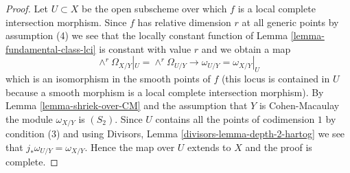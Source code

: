 \documentclass[10pt,a4paper]{amsart}
\theoremstyle{plain}
\theoremstyle{definition}
\theoremstyle{remark}
\numberwithin{equation}{subsection}
\begin{document}
\begin{proof}
Let $U \subset X$ be the open subscheme over which $f$ is a
local complete intersection morphism. Since $f$ has relative
dimension $r$ at all generic points by assumption (4) we
see that the locally constant function of
Lemma \ref{lemma-fundamental-class-lci}
is constant with value $r$ and we obtain a map
$$
\wedge^r\Omega_{X/Y}|_U = \wedge^r \Omega_{U/Y}
\longrightarrow
\omega_{U/Y} = \omega_{X/Y}|_U
$$
which is an isomorphism in the smooth points of $f$ (this locus
is contained in $U$ because a smooth morphism is a local complete
intersection morphism). By Lemma \ref{lemma-shriek-over-CM}
and the assumption that $Y$ is Cohen-Macaulay
the module $\omega_{X/Y}$ is $(S_2)$.
Since $U$ contains all the points of codimension $1$ by condition (3)
and using Divisors, Lemma \ref{divisors-lemma-depth-2-hartog}
we see that $j_*\omega_{U/Y} = \omega_{X/Y}$.
Hence the map over $U$ extends to $X$ and the proof
is complete.
\end{proof}
\end{document}
